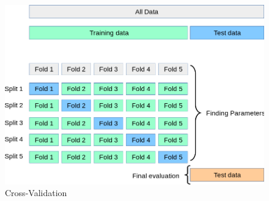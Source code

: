 \documentclass[12pt]{article}
\begin{document}
\begin{figure}[h]

\centering
\includegraphics[scale=0.5]{crossvalidation.png}
\caption{Cross-Validation}
\end{figure}


\FloatBarrier



%


\end{document}
